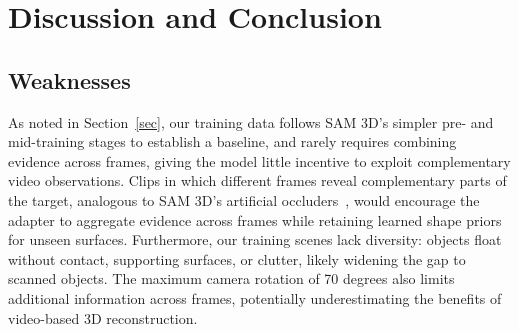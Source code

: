 \documentclass{article}
\begin{document}

\section{Discussion and Conclusion}

\subsection{Weaknesses}

As noted in Section~\ref{sec}, our training data follows
SAM 3D's simpler pre- and mid-training stages to establish a baseline,
and rarely requires combining evidence across frames, giving the model
little incentive to exploit complementary video observations.
Clips in which different frames reveal complementary parts of the target,
analogous to SAM 3D's artificial occluders~\cite{sam3d},
would encourage the adapter to aggregate evidence across frames
while retaining learned shape priors for unseen surfaces.
Furthermore, our training scenes lack diversity:
objects float without contact, supporting surfaces, or clutter,
likely widening the gap to scanned objects.
The maximum camera rotation of 70 degrees also limits additional
information across frames, potentially underestimating the benefits
of video-based 3D reconstruction.
\end{document}

